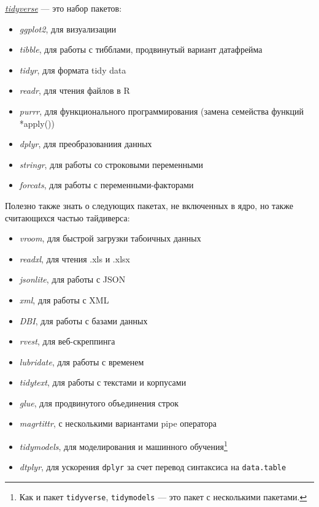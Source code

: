\documentclass[]{book}
\providecommand{\tightlist}{%
  \setlength{\itemsep}{0pt}\setlength{\parskip}{0pt}}
\begin{document}
\href{https://www.tidyverse.org}{\emph{tidyverse}} --- это набор
пакетов:

\begin{itemize}
\tightlist
\item
  \emph{ggplot2}, для визуализации
\item
  \emph{tibble}, для работы с тибблами, продвинутый вариант датафрейма
\item
  \emph{tidyr}, для формата tidy data
\item
  \emph{readr}, для чтения файлов в R
\item
  \emph{purrr}, для функционального программирования (замена семейства
  функций *apply())
\item
  \emph{dplyr}, для преобразованиия данных
\item
  \emph{stringr}, для работы со строковыми переменными
\item
  \emph{forcats}, для работы с переменными-факторами
\end{itemize}

Полезно также знать о следующих пакетах, не включенных в ядро, но также
считающихся частью тайдиверса:

\begin{itemize}
\tightlist
\item
  \emph{vroom}, для быстрой загрузки табоичных данных
\item
  \emph{readxl}, для чтения .xls и .xlsx
\item
  \emph{jsonlite}, для работы с JSON
\item
  \emph{xml}, для работы с XML
\item
  \emph{DBI}, для работы с базами данных
\item
  \emph{rvest}, для веб-скреппинга
\item
  \emph{lubridate}, для работы с временем
\item
  \emph{tidytext}, для работы с текстами и корпусами
\item
  \emph{glue}, для продвинутого объединения строк
\item
  \emph{magrtittr}, с несколькими вариантами pipe оператора
\item
  \emph{tidymodels}, для моделирования и машинного обучения\footnote{Как
    и пакет \texttt{tidyverse}, \texttt{tidymodels} --- это пакет с
    несколькими пакетами.}
\item
  \emph{dtplyr}, для ускорения \texttt{dplyr} за счет перевод синтаксиса
  на \texttt{data.table}
\end{itemize}
\end{document}
